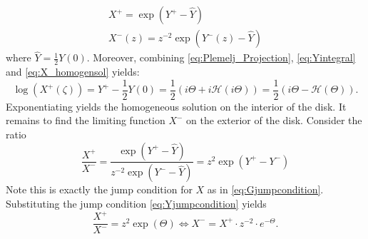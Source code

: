 \begin{equation} \label{eq:X_homogensol}
    \begin{matrix}
        X^+ = \exp(Y^+ - \hat Y) \\
        X^-(z) = z^{-2} \exp(Y^-(z) - \hat Y)
    \end{matrix}
\end{equation}
where $\hat Y=\frac{1}{2}Y(0)$.
Moreover, combining \ref{eq:Plemelj_Projection}, \eqref{eq:Yintegral} and \eqref{eq:X_homogensol} yields:
\begin{equation}
    \log(X^+(\zeta)) = Y^+-\frac{1}{2}Y(0) = \frac{1}{2} \left(i\Theta + i \mathcal{H}(i\Theta)\right) = \frac{1}{2} \left(i\Theta - \mathcal{H}(\Theta)\right).
\end{equation}
Exponentiating yields the homogeneous solution on the interior of the disk. It remains to find the limiting function $X^-$ on the exterior of the disk.
Consider the ratio 
\begin{equation} \label{eq:Gdefinition}
    \frac{X^+}{X^-} = \frac{\exp(Y^+ - \hat Y)}{z^{-2} \exp(Y^- - \hat Y)} = z^2 \exp(Y^+ - Y^-)
\end{equation}
Note this is exactly the jump condition for $X$ as in \eqref{eq:Gjumpcondition}.
Substituting the jump condition \ref{eq:Yjumpcondition} yields 
\begin{equation}
    \frac{X^+}{X^-} = z^2 \exp(\Theta) \iff X^- = X^+ \cdot z^{-2} \cdot e^{-\Theta}.
\end{equation}

